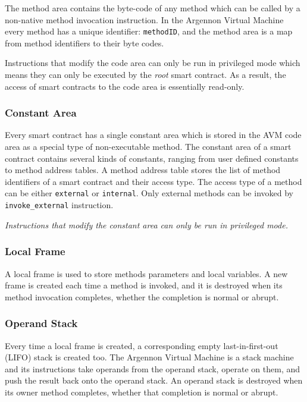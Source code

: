 \documentclass[11pt, a4paper]{report}
\newcommand{\note}[1] {
    \begin{tcolorbox}[colframe=white,colback=white]
        \emph{#1}
    \end{tcolorbox}
}
\begin{document}
    The method area contains the byte-code of any method which can be called by a non-native method invocation
    instruction. In the Argennon Virtual Machine every method has a unique identifier:
    \texttt{methodID}, and the method area is a map from method identifiers to their byte codes.

    Instructions that modify the code area can only be run in privileged mode which means they can only be executed
    by the \emph{root} smart contract. As a result, the access of smart contracts to the code area is essentially
    read-only.

    \subsubsection{Constant Area}

    Every smart contract has a single constant area which is stored in the AVM code area as a special type of
    non-executable method. The constant area of a smart contract contains several kinds of constants, ranging from user
    defined constants to method address tables. A method address table stores the list of method identifiers of a smart
    contract and their access type. The access type of a method can be either \texttt{external} or \texttt{internal}.
    Only external methods can be invoked by \texttt{invoke\_external} instruction.

    \note{Instructions that modify the constant area can only be run in privileged mode.}


    \subsubsection{Local Frame}

    A local frame is used to store methods parameters and local variables. A new frame is created each time a method
    is invoked, and it is destroyed when its method invocation completes, whether the completion is normal or abrupt.

    \subsubsection{Operand Stack}

    Every time a local frame is created, a corresponding empty last-in-first-out (LIFO) stack is created too. The
    Argennon Virtual Machine is a stack machine and its instructions take operands from the operand stack, operate on
    them, and push the result back onto the operand stack. An operand stack is destroyed when its owner method
    completes, whether that completion is normal or abrupt.
\end{document}
